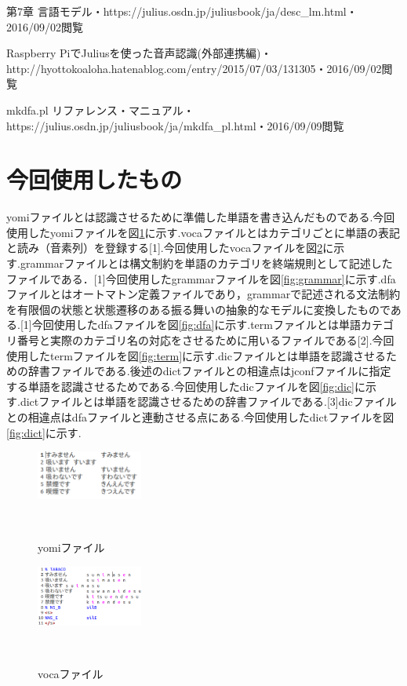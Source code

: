 \documentclass[11pt]{si2016}
\begin{document}
\begin{thebibliography}{1}
   第7章 言語モデル・https://julius.osdn.jp/juliusbook/ja/desc_lm.html・2016/09/02閲覧


   Raspberry PiでJuliusを使った音声認識(外部連携編)・http://hyottokoaloha.hatenablog.com/entry/2015/07/03/131305・2016/09/02閲覧


   mkdfa.pl リファレンス・マニュアル・https://julius.osdn.jp/juliusbook/ja/mkdfa_pl.html・2016/09/09閲覧


\appendix
\section{今回使用したもの}
yomiファイルとは認識させるために準備した単語を書き込んだものである.今回使用したyomiファイルを図\ref{fig:yomi}に示す.vocaファイルとはカテゴリごとに単語の表記と読み（音素列）を登録する[1].今回使用したvocaファイルを図\ref{fig:voca}に示す.grammarファイルとは構文制約を単語のカテゴリを終端規則として記述したファイルである．[1]今回使用したgrammarファイルを図\ref{fig:grammar}に示す.dfaファイルとはオートマトン定義ファイルであり，grammarで記述される文法制約を有限個の状態と状態遷移のある振る舞いの抽象的なモデルに変換したものである.[1]今回使用したdfaファイルを図\ref{fig:dfa}に示す.termファイルとは単語カテゴリ番号と実際のカテゴリ名の対応をさせるために用いるファイルである[2].今回使用したtermファイルを図\ref{fig:term}に示す.dicファイルとは単語を認識させるための辞書ファイルである.後述のdictファイルとの相違点はjconfファイルに指定する単語を認識させるためである.今回使用したdicファイルを図\ref{fig:dic}に示す.dictファイルとは単語を認識させるための辞書ファイルである.[3]dicファイルとの相違点はdfaファイルと連動させる点にある.今回使用したdictファイルを図\ref{fig:dict}に示す.


\begin{figure}[h]
 \begin{center}
  \includegraphics[width=35mm]{img/yomi.png}
 　\caption{yomiファイル}
 　\label{fig:yomi}
 \end{center}
\end{figure}


\begin{figure}[h]
 \begin{center}
  \includegraphics[width=35mm]{img/voca.png}
 　\caption{vocaファイル}
 　\label{fig:voca}
 \end{center}
\end{figure}



\end{thebibliography}
\end{document}
